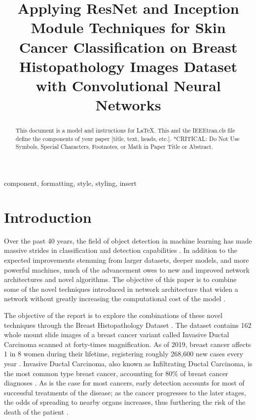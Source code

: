 \documentclass[conference]{IEEEtran}
\begin{document}


\title{Applying ResNet and Inception Module Techniques for Skin Cancer Classification on Breast Histopathology Images Dataset with Convolutional Neural Networks\\
}

\author{
}

\maketitle

\begin{abstract}
This document is a model and instructions for \LaTeX.
This and the IEEEtran.cls file define the components of your paper [title, text, heads, etc.]. *CRITICAL: Do Not Use Symbols, Special Characters, Footnotes, 
or Math in Paper Title or Abstract.
\end{abstract}

\begin{IEEEkeywords}
component, formatting, style, styling, insert
\end{IEEEkeywords}

\section{Introduction}
Over the past 40 years, the field of object detection in machine learning has made massive strides in classification and detection capabilities \cite{Fukushima1980}. In addition to the expected improvements stemming from larger datasets, deeper models, and more powerful machines, much of the advancement owes to new and improved network architectures and novel algorithms. The objective of this paper is to combine some of the novel techniques introduced in network architecture that widen a network without greatly increasing the computational cost of the model \cite{He2016, Szegedy2014}.

The objective of the report is to explore the combinations of these novel techniques through the Breast Histopathology Dataset \cite{Mooney2017}. The dataset contains 162 whole mount slide images of a breast cancer variant called Invasive Ductal Carcinoma scanned at forty-times magnification. As of 2019, breast cancer affects 1 in 8 women during their lifetime, registering roughly 268,600 new cases every year \cite{DeSantis2019}. Invasive Ductal Carcinoma, also known as Infiltrating Ductal Carcinoma, is the most common type breast cancer, accounting for 80\% of breast cancer diagnoses \cite{Sharma2010}. As is the case for most cancers, early detection accounts for most of successful treatments of the disease; as the cancer progresses to the later stages, the odds of spreading to nearby organs increases, thus furthering the risk of the death of the patient \cite{Milosevic2018}.
\end{document}
